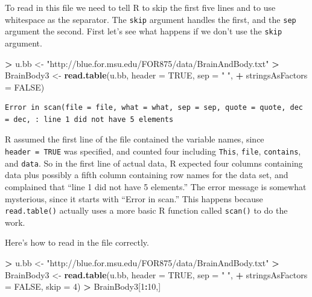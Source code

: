 \documentclass[]{krantz}
\makeatletter
\newenvironment{Shaded}{\begin{snugshade}}{\end{snugshade}}
\newcommand{\KeywordTok}[1]{\textcolor[rgb]{0.27,0.27,0.27}{\textbf{#1}}}
\newcommand{\DataTypeTok}[1]{\textcolor[rgb]{0.27,0.27,0.27}{#1}}
\newcommand{\DecValTok}[1]{\textcolor[rgb]{0.06,0.06,0.06}{#1}}
\newcommand{\StringTok}[1]{\textcolor[rgb]{0.5,0.5,0.5}{#1}}
\newcommand{\OtherTok}[1]{\textcolor[rgb]{0.37,0.37,0.37}{#1}}
\newcommand{\OperatorTok}[1]{\textcolor[rgb]{0.43,0.43,0.43}{\textbf{#1}}}
\newcommand{\NormalTok}[1]{#1}
\newenvironment{kframe}{%
\medskip{}
\setlength{\fboxsep}{.8em}
 \def\at@end@of@kframe{}%
 \ifinner\ifhmode%
  \def\at@end@of@kframe{\end{minipage}}%
  \begin{minipage}{\columnwidth}%
 \fi\fi%
 \def\FrameCommand##1{\hskip\@totalleftmargin \hskip-\fboxsep
 \colorbox{shadecolor}{##1}\hskip-\fboxsep
     \hskip-\linewidth \hskip-\@totalleftmargin \hskip\columnwidth}%
 \MakeFramed {\advance\hsize-\width
   \@totalleftmargin\z@ \linewidth\hsize
   \@setminipage}}%
 {\par\unskip\endMakeFramed%
 \at@end@of@kframe}
\renewenvironment{Shaded}{\begin{kframe}}{\end{kframe}}
\makeatother
\begin{document}
To read in this file we need to tell R to skip the first five lines and
to use whitespace as the separator. The \texttt{skip} argument handles
the first, and the \texttt{sep} argument the second. First let's see
what happens if we don't use the \texttt{skip} argument.

\begin{Shaded}
\begin{Highlighting}[]
\OperatorTok{>}\StringTok{ }\NormalTok{u.bb <-}\StringTok{ "http://blue.for.msu.edu/FOR875/data/BrainAndBody.txt"}
\OperatorTok{>}\StringTok{ }\NormalTok{BrainBody3 <-}\StringTok{ }\KeywordTok{read.table}\NormalTok{(u.bb, }\DataTypeTok{header =} \OtherTok{TRUE}\NormalTok{, }\DataTypeTok{sep =} \StringTok{" "}\NormalTok{, }
\OperatorTok{+}\StringTok{                          }\DataTypeTok{stringsAsFactors =} \OtherTok{FALSE}\NormalTok{)}
\end{Highlighting}
\end{Shaded}

\begin{verbatim}
Error in scan(file = file, what = what, sep = sep, quote = quote, dec = dec, : line 1 did not have 5 elements
\end{verbatim}

R assumed the first line of the file contained the variable names, since
\texttt{header\ =\ TRUE} was specified, and counted four including
\texttt{This}, \texttt{file}, \texttt{contains}, and \texttt{data}. So
in the first line of actual data, R expected four columns containing
data plus possibly a fifth column containing row names for the data set,
and complained that ``line 1 did not have 5 elements.'' The error
message is somewhat mysterious, since it starts with ``Error in scan.''
This happens because \texttt{read.table()} actually uses a more basic R
function called \texttt{scan()} to do the work.

Here's how to read in the file correctly.

\begin{Shaded}
\begin{Highlighting}[]
\OperatorTok{>}\StringTok{ }\NormalTok{u.bb <-}\StringTok{ "http://blue.for.msu.edu/FOR875/data/BrainAndBody.txt"}
\OperatorTok{>}\StringTok{ }\NormalTok{BrainBody3 <-}\StringTok{ }\KeywordTok{read.table}\NormalTok{(u.bb, }\DataTypeTok{header =} \OtherTok{TRUE}\NormalTok{, }\DataTypeTok{sep =} \StringTok{" "}\NormalTok{, }
\OperatorTok{+}\StringTok{                          }\DataTypeTok{stringsAsFactors =} \OtherTok{FALSE}\NormalTok{, }\DataTypeTok{skip =} \DecValTok{4}\NormalTok{)}
\OperatorTok{>}\StringTok{ }\NormalTok{BrainBody3[}\DecValTok{1}\OperatorTok{:}\DecValTok{10}\NormalTok{,]}
\end{Highlighting}
\end{Shaded}
\end{document}
